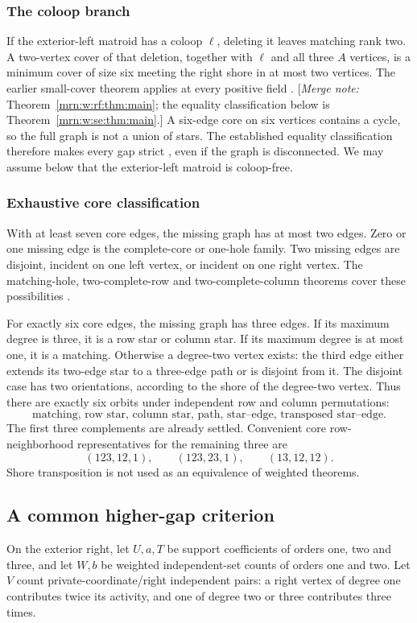 \documentclass[11pt,a4paper]{article}
\theoremstyle{remark}\newtheorem{remark}[theorem]{Remark}
\newcommand{\mnote}[1]{[\textit{Merge note:} #1]}
\begin{document}
\subsubsection{The coloop branch}
If the exterior-left matroid has a coloop $\ell$, deleting it leaves matching rank two. A two-vertex cover of that deletion, together with $\ell$ and all three $A$ vertices, is a minimum cover of size six meeting the right shore in at most two vertices. The earlier small-cover theorem applies at every positive field \cite{b:m74}. \mnote{Theorem~\ref{mrn:w:rf:thm:main}; the equality classification below is Theorem~\ref{mrn:w:se:thm:main}.} A six-edge core on six vertices contains a cycle, so the full graph is not a union of stars. The established equality classification therefore makes every gap strict \cite{b:m72}, even if the graph is disconnected. We may assume below that the exterior-left matroid is coloop-free.

\subsubsection{Exhaustive core classification}
With at least seven core edges, the missing graph has at most two edges. Zero or one missing edge is the complete-core or one-hole family. Two missing edges are disjoint, incident on one left vertex, or incident on one right vertex. The matching-hole, two-complete-row and two-complete-column theorems cover these possibilities \cite{b:m43,b:m38,b:m35,b:m32}.

For exactly six core edges, the missing graph has three edges. If its maximum degree is three, it is a row star or column star. If its maximum degree is at most one, it is a matching. Otherwise a degree-two vertex exists: the third edge either extends its two-edge star to a three-edge path or is disjoint from it. The disjoint case has two orientations, according to the shore of the degree-two vertex. Thus there are exactly six orbits under independent row and column permutations:
\[
 \text{matching,\ row star,\ column star,\ path,\ star--edge,\ transposed star--edge}.
\]
The first three complements are already settled. Convenient core row-neighborhood representatives for the remaining three are
\begin{equation}\label{mrn:e:se:eq:cores}
 (123,12,1),\qquad (123,23,1),\qquad (13,12,12).
\end{equation}
Shore transposition is not used as an equivalence of weighted theorems.

\subsection{A common higher-gap criterion}
On the exterior right, let $U,a,T$ be support coefficients of orders one, two and three, and let $W,b$ be weighted independent-set counts of orders one and two. Let $V$ count private-coordinate/right independent pairs: a right vertex of degree one contributes twice its activity, and one of degree two or three contributes three times.
\end{document}
